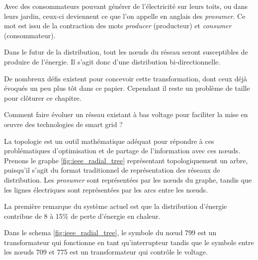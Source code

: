 Avec des consommateurs pouvant générer de l'électricité sur leurs toits, ou dans leurs jardin,
ceux-ci deviennent ce que l'on appelle en anglais des \textit{prosumer}.
Ce mot est issu de la contraction des mots \textit{producer} (producteur) et
\textit{consumer} (consommateur).

Dans le futur de la distribution, tout les nœuds du réseau seront susceptibles de produire de l'énergie.
Il s'agit donc d'une distribution bi-directionnelle.

De nombreux défis existent pour concevoir cette transformation, dont ceux déjà évoqués un peu plus tôt dans ce papier.
Cependant il reste un problème de taille pour clôturer ce chapitre.

Comment faire évoluer un réseau existant à bas voltage pour faciliter la mise en œuvre des technologies
de smart grid ?

La topologie est un outil mathématique adéquat pour répondre à ces problématiques d'optimisation
et de partage de l'information avec ces nœuds.
Prenons le graphe \ref{fig:ieee_radial_tree} représentant topologiquement un arbre,
puisqu'il s'agit du format traditionnel de représentation des réseaux de distribution.
Les \textit{prosumer} sont représentées par les nœuds du graphe,
tandis que les lignes électriques sont représentées par les arcs entre les nœuds.

La première remarque du système actuel est que la distribution d'énergie contribue de 8 à 15\% de perte
d'énergie en chaleur.

Dans le schema \ref{fig:ieee_radial_tree}, le symbole du nœud 799 est un transformateur qui
fonctionne en tant qu'interrupteur tandis que le symbole entre les nœuds
709 et 775 est un transformateur qui contrôle le voltage.

